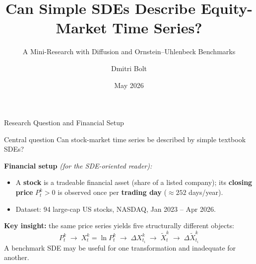 \documentclass[aspectratio=169,10pt]{beamer}
\title[SDEs in Equity Markets]{%
  Can Simple SDEs Describe Equity-Market Time Series?}
\subtitle{A Mini-Research with Diffusion and Ornstein--Uhlenbeck Benchmarks}
\author{Dmitri Bolt}
\date{May 2026}
\institute{Educational Mini-Research}
\begin{document}

\begin{frame}
  \titlepage
\end{frame}

\begin{frame}{Research Question and Financial Setup}
\begin{block}{Central question}
Can stock-market time series be described by simple textbook SDEs?
\end{block}

\smallskip
\textbf{Financial setup} \textit{(for the SDE-oriented reader):}
\begin{itemize}
  \item A \textbf{stock} is a tradeable financial asset (share of a listed company);
        its \textbf{closing price} $P_t^k > 0$ is observed once per \textbf{trading day}
        ($\approx 252$ days/year).
  \item Dataset: 94 large-cap US stocks, NASDAQ, Jan 2023 -- Apr 2026.
\end{itemize}

\medskip
\textbf{Key insight:} the same price series yields five structurally different objects:
\[
P_{t}^{k}
\;\to\; X_{t}^{k} = \ln P_{t}^{k}
\;\to\; \Delta X_{t_i}^{k}
\;\to\; \widetilde{X}_{t}^{k}
\;\to\; \Delta\widetilde{X}_{t_i}^{k}
\]
A benchmark SDE may be useful for one transformation and inadequate for another.

\end{frame}
\end{document}
